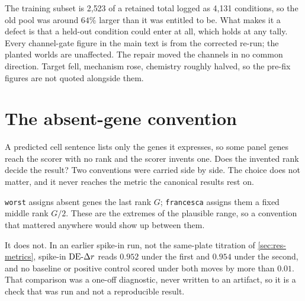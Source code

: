 The training subset is
2{,}523 of a retained total logged as
4{,}131 conditions, so the old
pool was around $64\%$ larger than it was entitled to be. What makes it a defect
is that a held-out condition could enter at all, which holds at any tally. Every
channel-gate figure in the main text is from the corrected
re-run; the planted worlds are unaffected. The
repair moved the channels in no common direction. Target fell, mechanism rose,
chemistry roughly halved, so the pre-fix figures are not quoted alongside them.

%
\section{The absent-gene convention}
\label{sec:app-convention}

\begin{question}
A predicted cell sentence lists only the genes it expresses, so some panel genes
reach the scorer with no rank and the scorer invents one. Does the invented rank
decide the result? Two conventions were carried side by side. The choice does
not matter, and it never reaches the metric the canonical results rest on.
\end{question}

\noindent
\texttt{worst} assigns absent genes the last rank $G$; \texttt{francesca}
assigns them a fixed middle rank $G/2$. These are the extremes of the plausible
range, so a convention that mattered anywhere would show up between them.

It does not. In an earlier spike-in run, not the same-plate titration of \cref{sec:res-metrics}, spike-in $\textrm{DE-}\Delta r$ reads $0.952$ under the first and $0.954$ under the second, and no baseline or positive control scored under both moves by more
than $0.01$. That comparison was a one-off diagnostic, never written to an
artifact, so it is a check that was run and not a reproducible result.

